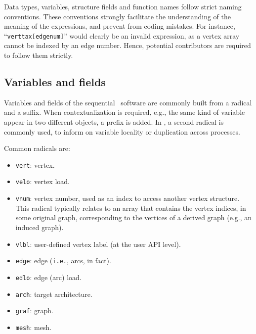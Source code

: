 Data types, variables, structure fields and function names follow
strict naming conventions. These conventions strongly facilitate the
understanding of the meaning of the expressions, and prevent from
coding mistakes. For instance, ``\texttt{verttax[edgenum]}'' would
clearly be an invalid expression, as a vertex array cannot be indexed
by an edge number. Hence, potential contributors are required to
follow them strictly.

\subsection{Variables and fields}
\label{sec-naming-variables}

Variables and fields of the sequential \scotch\ software are commonly
built from a radical and a suffix. When contextualization is required,
e.g., the same kind of variable appear in two different objects, a
prefix is added. In \ptscotch, a second radical is commonly used, to
inform on variable locality or duplication across processes.

Common radicals are:
\begin{itemize}
\item
\texttt{vert}: vertex.
\item
\texttt{velo}: vertex load.
\item
\texttt{vnum}: vertex number, used as an index to access another vertex
structure. This radical typically relates to an array that contains
the vertex indices, in some original graph, corresponding to the
vertices of a derived graph (e.g., an induced graph).
\item
\texttt{vlbl}: user-defined vertex label (at the user API level).
\item
\texttt{edge}: edge (\texttt{i.e.}, arcs, in fact).
\item
\texttt{edlo}: edge (arc) load.
\item
\texttt{arch}: target architecture.
\item
\texttt{graf}: graph.
\item
\texttt{mesh}: mesh.
\end{itemize}

